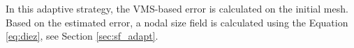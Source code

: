 In this adaptive strategy, the VMS-based error is calculated on the initial mesh. Based on the estimated error, a nodal size field is calculated using the Equation \eqref{eq:diez}, see Section \ref{sec:sf_adapt}.



